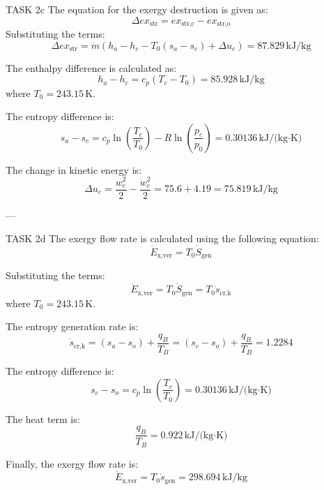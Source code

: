 TASK 2c  
The equation for the exergy destruction is given as:  
\[
\Delta ex_{\text{str}} = ex_{\text{str,c}} - ex_{\text{str,o}}
\]  
Substituting the terms:  
\[
\Delta ex_{\text{str}} = \dot{m} \left( h_a - h_c - T_0 (s_a - s_c) + \Delta u_e \right) = 87.829 \, \text{kJ/kg}
\]  

The enthalpy difference is calculated as:  
\[
h_a - h_c = c_p (T_c - T_0) = 85.928 \, \text{kJ/kg}
\]  
where \( T_0 = 243.15 \, \text{K} \).  

The entropy difference is:  
\[
s_a - s_c = c_p \ln \left( \frac{T_c}{T_0} \right) - R \ln \left( \frac{p_c}{p_0} \right) = 0.30136 \, \text{kJ/(kg·K)}
\]  

The change in kinetic energy is:  
\[
\Delta u_e = \frac{w_e^2}{2} - \frac{w_c^2}{2} = 75.6 + 4.19 = 75.819 \, \text{kJ/kg}
\]  

---

TASK 2d  
The exergy flow rate is calculated using the following equation:  
\[
\dot{E}_{\text{x,ver}} = T_0 \dot{S}_{\text{gen}}
\]  

Substituting the terms:  
\[
\dot{E}_{\text{x,ver}} = T_0 \dot{S}_{\text{gen}} = T_0 \dot{s}_{\text{cr,k}}
\]  
where \( T_0 = 243.15 \, \text{K} \).  

The entropy generation rate is:  
\[
\dot{s}_{\text{cr,k}} = (s_a - s_o) + \frac{q_B}{T_B} = (s_c - s_o) + \frac{q_B}{T_B} = 1.2284
\]  

The entropy difference is:  
\[
s_c - s_o = c_p \ln \left( \frac{T_c}{T_0} \right) = 0.30136 \, \text{kJ/(kg·K)}
\]  

The heat term is:  
\[
\frac{q_B}{T_B} = 0.922 \, \text{kJ/(kg·K)}
\]  

Finally, the exergy flow rate is:  
\[
\dot{E}_{\text{x,ver}} = T_0 \dot{s}_{\text{gen}} = 298.694 \, \text{kJ/kg}
\]  